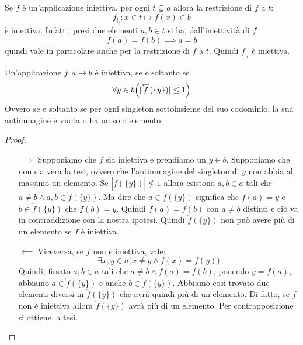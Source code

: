 \begin{osservation}
	Se $f$ è un'applicazione iniettiva, per ogni $t \subseteq a$ allora la restrizione di $f$ a $t$:
	\begin{displaymath}
		f_{\vert_{t}}: x \in t \mapsto f(x) \in b
	\end{displaymath}
	è iniettiva. Infatti, presi due elementi $a,b \in t$ si ha, dall'iniettività di $f$
	\begin{displaymath}
		f(a) = f(b)  \implies a = b
	\end{displaymath}
	quindi vale in particolare anche per la restrizione di $f$ a $t$. Quindi $f_{\vert_{t}}$ è iniettiva.
\end{osservation}

\begin{propbox}
	Un'applicazione $f:a \longrightarrow b$ è iniettiva, se e soltanto se
	\begin{displaymath}
		\forall y \in b \Bigl( |\overleftarrow{f}(\{y\})| \leq 1 \Bigr)
	\end{displaymath}
	Ovvero se e soltanto se per ogni singleton sottoinsieme del suo codominio, la sua antimmagine è vuota o ha un solo elemento.
\end{propbox}


\begin{proof}
	\begin{itemize}
		\item[$\implies$] Supponiamo che $f$ sia iniettiva e prendiamo un $y \in b$. Supponiamo che non sia vera la tesi, ovvero che l'antimmagine del singleton di $y$ non abbia al massimo un elemento. Se $|\overleftarrow{f}(\{y\})| \nleq 1$ allora esistono $a,b \in a$ tali che $a \neq b \wedge a,b \in \overleftarrow{f}(\{y\})$. Ma dire che $ a \in \overleftarrow{f}(\{y\})$ significa che $f(a)=y$ e $b \in \overleftarrow{f}(\{y\})$ che $f(b) =y$. Quindi $f(a)=f(b)$ con $a \neq b$ distinti e ciò va in contraddizione con la nostra ipotesi. Quindi $\overleftarrow{f}(\{y\})$ non può avere più di un elemento se $f$ è iniettiva.
		\item[$\impliedby$] Viceversa, se $f$ non è iniettiva, vale:
		\begin{displaymath}
			\exists x,y \in a \bigl( x \neq y \wedge f(x)=f(y)\bigr)
		\end{displaymath}
		Quindi, fissato $a,b \in a$ tali che $a \neq b \wedge f(a)=f(b)$, ponendo $y=f(a)$, abbiamo $a \in \overleftarrow{f}(\{y\})$ e anche $b \in \overleftarrow{f}(\{y\})$. Abbiamo così trovato due elementi diversi in $\overleftarrow{f}(\{y\})$ che avrà quindi più di un elemento. Di fatto, se $f$ non è iniettiva allora $\overleftarrow{f}(\{y\})$ avrà più di un elemento. Per contrapposizione si ottiene la tesi.
	\end{itemize}
\end{proof}

